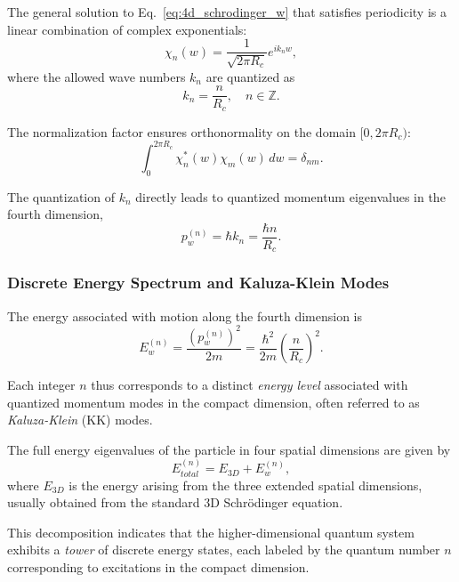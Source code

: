 \documentclass[12pt]{article}
\begin{document}
The general solution to Eq.~\eqref{eq:4d_schrodinger_w} that satisfies periodicity is a linear combination of complex exponentials:
\begin{equation}
    \chi_n(w) = \frac{1}{\sqrt{2 \pi R_c}} e^{i k_n w},
    \label{eq:eigenfunction_fourth_dim}
\end{equation}
where the allowed wave numbers \(k_n\) are quantized as
\begin{equation}
    k_n = \frac{n}{R_c}, \quad n \in \mathbb{Z}.
    \label{eq:wave_number_quantization}
\end{equation}

The normalization factor ensures orthonormality on the domain \([0, 2\pi R_c)\):
\begin{equation}
    \int_0^{2 \pi R_c} \chi_n^*(w) \chi_m(w) \, dw = \delta_{nm}.
\end{equation}

The quantization of \(k_n\) directly leads to quantized momentum eigenvalues in the fourth dimension,
\begin{equation}
    p_w^{(n)} = \hbar k_n = \frac{\hbar n}{R_c}.
\end{equation}

\subsubsection*{Discrete Energy Spectrum and Kaluza-Klein Modes}

The energy associated with motion along the fourth dimension is
\begin{equation}
    E_w^{(n)} = \frac{(p_w^{(n)})^2}{2m} = \frac{\hbar^2}{2m} \left( \frac{n}{R_c} \right)^2.
    \label{eq:energy_quantization_fourth_dim}
\end{equation}

Each integer \(n\) thus corresponds to a distinct \emph{energy level} associated with quantized momentum modes in the compact dimension, often referred to as \emph{Kaluza-Klein} (KK) modes.

The full energy eigenvalues of the particle in four spatial dimensions are given by
\begin{equation}
    E_{total}^{(n)} = E_{3D} + E_w^{(n)},
    \label{eq:total_energy_4d}
\end{equation}
where \(E_{3D}\) is the energy arising from the three extended spatial dimensions, usually obtained from the standard 3D Schrödinger equation.

This decomposition indicates that the higher-dimensional quantum system exhibits a \emph{tower} of discrete energy states, each labeled by the quantum number \(n\) corresponding to excitations in the compact dimension.
\end{document}
